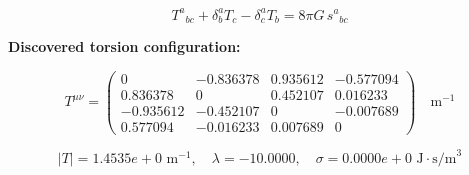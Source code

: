 
\begin{equation}
  T^a{}_{bc} + \delta^a_b T_c - \delta^a_c T_b = 8\pi G \, s^a{}_{bc}
\end{equation}

\textbf{Discovered torsion configuration:}

\begin{equation}
  T^{\mu\nu} = \begin{pmatrix}
    0 & -0.836378 & 0.935612 & -0.577094 \\
    0.836378 & 0 & 0.452107 & 0.016233 \\
    -0.935612 & -0.452107 & 0 & -0.007689 \\
    0.577094 & -0.016233 & 0.007689 & 0
  \end{pmatrix} \quad \text{m}^{-1}
\end{equation}

\begin{equation}
  |T| = 1.4535e+0 \text{ m}^{-1}, \quad
  \lambda = -10.0000, \quad
  \sigma = 0.0000e+0 \text{ J}\cdot\text{s/m}^3
\end{equation}